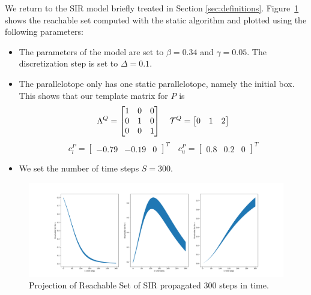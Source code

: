 \begin{example}
\label{ex:sir_kaa}
  We return to the SIR model briefly treated in Section \ref{sec:definitions}. Figure~\ref{fig:kaa_sir} shows the reachable set computed with the static algorithm and plotted using the following parameters:
  \begin{itemize}
    \item The parameters of the model are set to $\beta = 0.34$ and $\gamma = 0.05$. The discretization step is set to $\Delta = 0.1$.
    \item The parallelotope only has one static parallelotope, namely the initial box. This shows that our template matrix for $P$ is
        \begin{equation*}
          \Lambda^Q = \begin{bmatrix}
                      1 & 0 & 0 \\
                      0 & 1 & 0 \\
                      0 & 0 & 1
                      \end{bmatrix}
                      \quad
          \mathcal{T}^Q = \begin{bmatrix}
                      0 & 1 & 2 \\
                      \end{bmatrix}
        \end{equation*}
        \begin{equation*}
            c_l^P = \begin{bmatrix} -0.79 & -0.19 & 0 \end{bmatrix}^T \quad c_u^P = \begin{bmatrix} 0.8 & 0.2 & 0 \end{bmatrix}^T
        \end{equation*}
    \item We set the number of time steps $S = 300$.
  \end{itemize}

  \begin{figure}[h!]
    \hspace*{-2.4cm}
    \includegraphics[width=\reachplotwidth\textwidth]{figures/SIRProj.png}
    \caption{Projection of Reachable Set of SIR propagated 300 steps in time.}
    \label{fig:kaa_sir}
  \end{figure}


\end{example}
